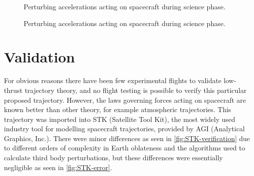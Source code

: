 \begin{figure}
\centering
\def\svgwidth{\figurewidth}

\caption{Perturbing accelerations acting on spacecraft during science phase.}
\label{fig:Science-pert}
\end{figure}

\begin{figure}
\centering
\def\svgwidth{\figurewidth}

\caption{Perturbing accelerations acting on spacecraft during science phase.}
\label{fig:Science-pert2}
\end{figure}


\section{Validation}
For obvious reasons there have been few experimental flights to validate low-thrust trajectory theory, and no flight testing is possible to verify this particular proposed trajectory. However, the laws governing forces acting on spacecraft are known better than other theory, for example atmospheric trajectories. This trajectory was imported into STK (Satellite Tool Kit), the most widely used industry tool for modelling spacecraft trajectories, provided by AGI (Analytical Graphics, Inc.). There were minor differences as seen in \ref{fig:STK-verification} due to different orders of complexity in Earth oblateness and the algorithms used to calculate third body perturbations, but these differences were essentially negligible as seen in \ref{fig:STK-error}.

